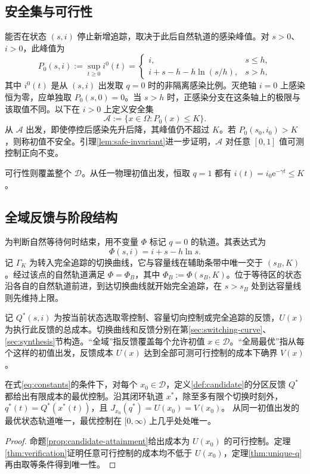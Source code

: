 \documentclass[lang=cn,a4paper,newtx]{elegantpaper}
\theoremstyle{plain}
\theoremstyle{definition}
\newcommand{\Acal}{\mathcal A}
\newcommand{\Dcal}{\mathcal D}
\newcommand{\e}{\mathrm e}
\begin{document}
\subsection{安全集与可行性}
能否在状态 $(s,i)$ 停止新增追踪，取决于此后自然轨道的感染峰值。对 $s>0$、$i>0$，此峰值为
\begin{equation}
 P_0(s,i):=\sup_{t\ge0}i^0(t)=
 \begin{cases}
  i,&s\le h,\\
  i+s-h-h\ln(s/h),&s>h,
 \end{cases}
 \label{eq:uncontrolled-future-peak}
\end{equation}
其中 $i^0(t)$ 是从 $(s,i)$ 出发取 $q=0$ 时的非隔离感染比例。灭绝轴 $i=0$ 上感染恒为零，应单独取 $P_0(s,0)=0$。当 $s>h$ 时，正感染分支在这条轴上的极限与该取值不同。以下在 $i>0$ 上定义安全集
\begin{equation}
 \Acal:=\{x\in\Omega:P_0(x)\le K\}.
 \label{eq:safe-set}
\end{equation}
从 $\Acal$ 出发，即使停控后感染先升后降，其峰值仍不超过 $K$。若 $P_0(s_0,i_0)>K$，则称初值不安全。引理\ref{lem:safe-invariant}进一步证明，$\Acal$ 对任意 $[0,1]$ 值可测控制正向不变。

可行性则覆盖整个 $\Dcal$。从任一物理初值出发，恒取 $q=1$ 都有 $i(t)=i_0\e^{-\gamma t}\le K$。

\subsection{全域反馈与阶段结构}
为判断自然等待何时结束，用不变量 $\Phi$ 标记 $q=0$ 的轨道。其表达式为
\begin{equation}
\Phi(s,i)=i+s-h\ln s.
\label{eq:Phi}
\end{equation}
记 $\Gamma_K$ 为转入完全追踪的切换曲线，它与容量线在辅助条带中唯一交于 $(s_B,K)$。经过该点的自然轨道满足 $\Phi=\Phi_B$，其中 $\Phi_B:=\Phi(s_B,K)$。位于等待区的状态沿各自的自然轨道前进，到达切换曲线就开始完全追踪，在 $s>s_B$ 处到达容量线则先维持上限。

记 $Q^*(s,i)$ 为按当前状态选取零控制、容量切向控制或完全追踪的反馈，$U(x)$ 为执行此反馈的总成本。切换曲线和反馈分别在第\ref{sec:switching-curve}、\ref{sec:synthesis}节构造。“全域”指反馈覆盖每个允许初值 $x\in\Dcal$。“全局最优”指从每个这样的初值出发，反馈成本 $U(x)$ 达到全部可测可行控制的成本下确界 $V(x)$。

\begin{theorem}[全域反馈的最优性与唯一性]
\label{thm:main-overview}
在式\eqref{eq:constants}的条件下，对每个 $x_0\in\Dcal$，定义\ref{def:candidate}的分区反馈 $Q^*$ 都给出有限成本的最优控制。沿其闭环轨道 $x^*$，除至多有限个切换时刻外，$q^*(t)=Q^*(x^*(t))$，且 $J_{x_0}(q^*)=U(x_0)=V(x_0)$。
从同一初值出发的最优状态轨道唯一，最优控制在 $[0,\infty)$ 上几乎处处唯一。
\end{theorem}
\begin{proof}
命题\ref{prop:candidate-attainment}给出成本为 $U(x_0)$ 的可行控制。定理\ref{thm:verification}证明任意可行控制的成本均不低于 $U(x_0)$，定理\ref{thm:unique-q}再由取等条件得到唯一性。
\end{proof}
\end{document}
